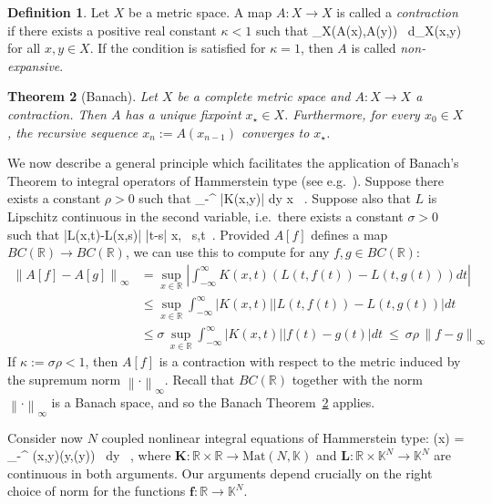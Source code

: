 \documentclass[12pt]{article}
\theoremstyle{plain}
\newtheorem{theorem}{Theorem}
\theoremstyle{definition}
\newtheorem{definition}[theorem]{Definition}
\numberwithin{equation}{section}
\numberwithin{theorem}{section}
\def\be#1\ee{\begin{equation}#1\end{equation}}
\renewcommand{\vec}[1]{\mathbf{#1}}
\begin{document}
\begin{definition} 
Let $X$ be a metric space. A map $A:X\rightarrow X$ is called a {\sl contraction} if there exists a positive real constant $\kappa<1$ such that \be
d_X(A(x),A(y)) \leq \kappa \, d_X(x,y)\ee
for all $x,y\in X$. If the condition is satisfied for $\kappa=1$, then $A$ is called {\sl non-expansive}.
\end{definition}

\begin{theorem}[Banach]\label{Banach}
Let $X$ be a complete metric space and $A:X\rightarrow X$ a contraction. Then $A$ has a unique fixpoint $x_\star\in X$. Furthermore, for every $x_0\in X$, the recursive sequence $x_n:=A(x_{n-1})$ converges to $x_\star$.
\end{theorem}


We now describe a general principle
which facilitates the application of 
Banach's Theorem 
to integral operators of Hammerstein type 
	(see e.g.\ \cite[16.6-1,\,Thm.\,3]{Polyanin}).
Suppose there exists a constant $\rho>0$ such that 
\be\int_{-\infty}^{\infty} \left|K(x,y)\right| dy \leq \rho
	\qquad {} \quad
x\in{} \ .
\ee 
Suppose also that $L$ is Lipschitz continuous in the second variable, 
i.e.\ there exists a constant $\sigma>0$ such that
\be\left|L(x,t)-L(x,s)\right| \leq \sigma \left|t-s\right| 
	\qquad {} \quad
x\in{}, \ s,t\in{}\ .\ee
Provided $A[f]$ defines a map $BC(\mathbb{R})\rightarrow BC(\mathbb{R})$, 
we can use this to compute for any $f,g\in BC(\mathbb{R})$:
\begin{align}
\left\| A[f]-A[g] \right\|_\infty &= \sup_{x\in\mathbb{R}} \left| \int_{-\infty}^{\infty} K(x,t) \left( L(t,f(t))-L(t,g(t)) \right) dt \right| \nonumber\\
&\leq \sup_{x\in\mathbb{R}}  \int_{-\infty}^{\infty}\left| K(x,t)\right| \left| L(t,f(t))-L(t,g(t))  \right| dt  \nonumber\\
&\leq \sigma \, \sup_{x\in\mathbb{R}}  \int_{-\infty}^{\infty}\left| K(x,t)\right| \left| f(t)-g(t)  \right| dt 
~\leq~ \sigma\rho \,\left\| f-g \right\|_\infty
\end{align}
If $\kappa:=\sigma\rho<1$, then $A[f]$ is a contraction with respect to the metric induced by the supremum norm $\left\|\cdot\right\|_\infty$. Recall that $BC(\mathbb{R})$ together with the norm $\left\|\cdot\right\|_\infty$ is a Banach space, and so the Banach Theorem~\ref{Banach} applies.

Consider now $N$ coupled nonlinear integral equations of Hammerstein type:
\be\vec{f}(x) = \int_{-\infty}^{\infty} \vec{K}(x,y)\cdot\vec{L}(y,\vec{f}(y)) \, dy \ ,\ee 
where
	$\vec{K}:\mathbb{R}\times\mathbb{R}\rightarrow \mathrm{Mat}(N,\mathbb{K})$ and
	$\vec{L}:\mathbb{R}\times\mathbb{K}^N\rightarrow\mathbb{K}^N$ 
are continuous in both arguments.
Our arguments depend crucially on the right choice of norm for the functions $\vec{f} :\mathbb{R} \to \mathbb{K}^N$.
\end{document}

